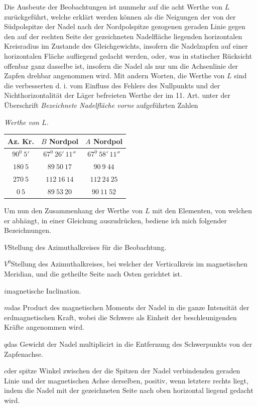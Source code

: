 Die Ausbeute der Beobachtungen ist nunmehr auf die acht Werthe von $L$ zurückgeführt, welche erklärt werden können als die Neigungen der von der Südpolspitze der Nadel nach der Nordpolspitze gezogenen geraden Linie gegen den auf der rechten Seite der gezeichneten Nadelfläche liegenden horizontalen Kreisradius im Zustande des Gleichgewichts, insofern die Nadelzapfen auf einer horizontalen Fläche aufliegend gedacht werden, oder, was in statischer Rücksicht offenbar ganz dasselbe ist, insofern die Nadel als nur um die Achsenlinie der Zapfen drehbar angenommen wird. Mit andern Worten, die Werthe von $L$ sind die verbesserten d. i. vom Einfluss des Fehlers des Nullpunkts und der Nichthorizontalität der Läger befreieten Werthe der im 11. Art. unter der Überschrift \textit{Bezeichnete Nadelfläche vorne} aufgeführten Zahlen
\begin{center}
\textit{Werthe von $L$.}\par\smallskip
\begin{tabular}{c|c|c}
Az. Kr.&$B$ Nordpol&$A$ Nordpol\\\hline
$90^0\ 5'$&$67^0\ 26'\ 11''$&$67^0\ 58'\ 11''$\\
$180\ 5$&$89\ 50\ 17$&$90\ 9\ 44$\\
$270\ 5$&$112\ 16\ 14$&$112\ 24\ 25$\\
$0\ 5$&$89\ 53\ 20$&$90\ 11\ 52$
\end{tabular}
\end{center}

Um nun den Zusammenhang der Werthe von $L$ mit den Elementen, von welchen er abhängt, in einer Gleichung auszudrücken, bediene ich mich folgender Bezeichnungen.

$V$\quad Stellung des Azimuthalkreises für die Beobachtung.

$V^0$\quad Stellung des Azimuthalkreises, bei welcher der Verticalkreis im magnetischen Meridian, und die getheilte Seite nach Osten gerichtet ist.

$i$\quad magnetische Inclination.


$m$\quad das Product des magnetischen Moments der Nadel in die ganze Intensität der erdmagnetischen Kraft, wobei die Schwere als Einheit der beschleunigenden Kräfte angenommen wird.

$q$\quad das Gewicht der Nadel multiplicirt in die Entfernung des Schwerpunkts von der Zapfenachse.

$c$\quad der spitze Winkel zwischen der die Spitzen der Nadel verbindenden geraden Linie und der magnetischen Achse derselben, positiv, wenn letztere rechts liegt, indem die Nadel mit der gezeichneten Seite nach oben horizontal liegend gedacht wird.

